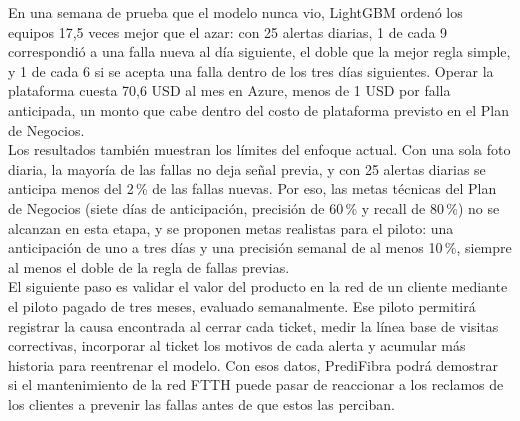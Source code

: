 \documentclass[12pt,a4paper]{article}
\begin{document}
    \noindent
    En una semana de prueba que el modelo nunca vio, LightGBM ordenó los equipos 17,5 veces mejor que el azar: con 25 alertas diarias, 1 de cada 9 correspondió a una falla nueva al día siguiente, el doble que la mejor regla simple, y 1 de cada 6 si se acepta una falla dentro de los tres días siguientes.
    Operar la plataforma cuesta 70,6 USD al mes en Azure, menos de 1 USD por falla anticipada, un monto que cabe dentro del costo de plataforma previsto en el Plan de Negocios.\\

    \noindent
    Los resultados también muestran los límites del enfoque actual. Con una sola foto diaria, la mayoría de las fallas no deja señal previa, y con 25 alertas diarias se anticipa menos del 2\,\% de las fallas nuevas.
    Por eso, las metas técnicas del Plan de Negocios (siete días de anticipación, precisión de 60\,\% y recall de 80\,\%) no se alcanzan en esta etapa, y se proponen metas realistas para el piloto: una anticipación de uno a tres días y una precisión semanal de al menos 10\,\%, siempre al menos el doble de la regla de fallas previas.\\

    \noindent
    El siguiente paso es validar el valor del producto en la red de un cliente mediante el piloto pagado de tres meses, evaluado semanalmente. Ese piloto permitirá registrar la causa encontrada al cerrar cada ticket, medir la línea base de visitas correctivas, incorporar al ticket los motivos de cada alerta y acumular más historia para reentrenar el modelo.
    Con esos datos, PrediFibra podrá demostrar si el mantenimiento de la red FTTH puede pasar de reaccionar a los reclamos de los clientes a prevenir las fallas antes de que estos las perciban.
\end{document}
